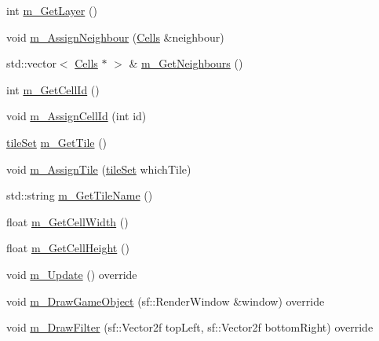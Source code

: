 \begin{DoxyCompactItemize}
int \mbox{\hyperlink{class_cells_ad45ab05eb579aa75a0c67c03eaefc0c0}{m\+\_\+\+Get\+Layer}} ()
\item 
void \mbox{\hyperlink{class_cells_a2d2d122fb7611a3f2c06f0e44b32dcdc}{m\+\_\+\+Assign\+Neighbour}} (\mbox{\hyperlink{class_cells}{Cells}} \&neighbour)
\item 
std\+::vector$<$ \mbox{\hyperlink{class_cells}{Cells}} $\ast$ $>$ \& \mbox{\hyperlink{class_cells_ab1b7667ae7e690e9e763d1dd02a5a46e}{m\+\_\+\+Get\+Neighbours}} ()
\item 
int \mbox{\hyperlink{class_cells_a230bc14139877d4b703d087784a0c5bc}{m\+\_\+\+Get\+Cell\+Id}} ()
\item 
void \mbox{\hyperlink{class_cells_a72a566e099b35379c90ad4e90bbcd793}{m\+\_\+\+Assign\+Cell\+Id}} (int id)
\item 
\mbox{\hyperlink{_cells_8h_adc5e4636eae42cdad2a070c6adbd9daf}{tile\+Set}} \mbox{\hyperlink{class_cells_a1ee8670d06fa37bbdbdb30796c0eeee0}{m\+\_\+\+Get\+Tile}} ()
\item 
void \mbox{\hyperlink{class_cells_a2b96194a69da35f886dc0bb542a4b3b8}{m\+\_\+\+Assign\+Tile}} (\mbox{\hyperlink{_cells_8h_adc5e4636eae42cdad2a070c6adbd9daf}{tile\+Set}} which\+Tile)
\item 
std\+::string \mbox{\hyperlink{class_cells_ae64b76c5e33a081910b1c93631f8dd4e}{m\+\_\+\+Get\+Tile\+Name}} ()
\item 
float \mbox{\hyperlink{class_cells_a8697fccb916059fd456256d038d8f1c2}{m\+\_\+\+Get\+Cell\+Width}} ()
\item 
float \mbox{\hyperlink{class_cells_ac5885d8ebc2418182b48d19b9e7fde08}{m\+\_\+\+Get\+Cell\+Height}} ()
\item 
void \mbox{\hyperlink{class_cells_a524d410412de7030016b99a4d8b0c1cc}{m\+\_\+\+Update}} () override
\item 
void \mbox{\hyperlink{class_cells_a09ab1aeac5c986cc28f52754fafd8c66}{m\+\_\+\+Draw\+Game\+Object}} (sf\+::\+Render\+Window \&window) override
\item 
void \mbox{\hyperlink{class_cells_a9c7eea82ba5ab8a840bbdcc0be25200f}{m\+\_\+\+Draw\+Filter}} (sf\+::\+Vector2f top\+Left, sf\+::\+Vector2f bottom\+Right) override
\end{DoxyCompactItemize}
